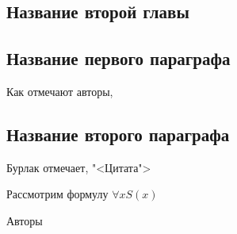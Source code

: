 \newpage

\begin{center}
\section{Название второй главы}	
\end{center}

\subsection{Название первого параграфа}
Как отмечают авторы, \autocite{Grice1975}

\subsection{Название второго параграфа}

Бурлак  отмечает, "<Цитата"> \autocite[23]{Grice1989}
 
Рассмотрим формулу $\forall x S(x)$

Авторы \autocite{Sanikov1999,Bulygina1997}


